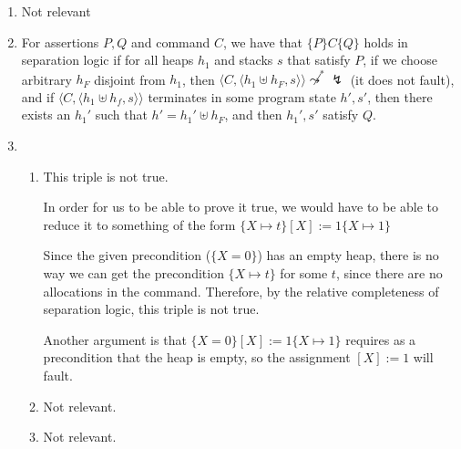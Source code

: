 


\begin{enumerate}[label=(\alph*)]

  \item
    Not relevant
\item
  For assertions $P,Q$ and command $C$, we have that $\{P\}C\{Q\}$ holds in separation logic if for all heaps $h_1$ and stacks $s$ that satisfy $P$, if we choose arbitrary $h_F$ disjoint from $h_1$, then $\langle C, \langle h_1 \uplus h_F, s \rangle \rangle \not \leadsto^* \lightning$ (it does not fault), and if $\langle C, \langle h_1 \uplus h_f, s \rangle \rangle$ terminates in some program state $h', s'$, then there exists an $h_1'$ such that $h' = h_1' \uplus h_F$, and then $h_1', s'$ satisfy $Q$.

  \item
    \begin{enumerate}[label=(\roman*)]
        \item
          This triple is not true.

          In order for us to be able to prove it true, we would have to be able to reduce it to something of the form $\{X \mapsto t\}[X]:= 1\{X \mapsto 1\}$

          Since the given precondition ($\{X = 0\}$) has an empty heap, there is no way we can get the precondition $\{X \mapsto t\}$ for some $t$, since there are no allocations in the command. Therefore, by the relative completeness of separation logic, this triple is not true.

          Another argument is that $\{X =0\}[X]:= 1\{X \mapsto 1\}$ requires as a precondition that the heap is empty, so the assignment $[X] := 1$ will fault.

          \item
            Not relevant.
          \item

            Not relevant.
    \end{enumerate}

        
    \end{enumerate}

